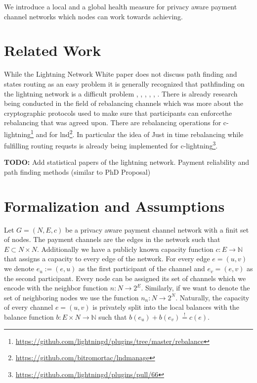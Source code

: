 \documentclass[a4paper]{paper}
\begin{document}
We introduce a local and a global health measure for privacy aware payment channel networks which nodes can work towards achieving.
\section{Related Work}
While the Lightning Network White paper \cite{poon2016bitcoin} does not discuss path finding and states routing as an easy problem it is generally recognized that pathfinding on the lightning network is a difficult problem \cite{piatkivskyi2018split}, \cite{prihodko2016flare}, \cite{bagaria2019boomerang}, \cite{pickhardt2019pathfinding}, \cite{grunspan2018ant}, \cite{sivaraman2018routing}.
There is already research being conducted in the field of rebalancing channels \cite{khalil2017revive} which was more about the cryptographic protocols used to make sure that participants can enforcethe rebalancing that was agreed upon.
There are rebalancing operations for c-lightning\footnote{\url{https://github.com/lightningd/plugins/tree/master/rebalance}} and for lnd\footnote{\url{https://github.com/bitromortac/lndmanage}}.
In particular the idea of Just in time rebalancing while fulfilling routing requsts \cite{pickhardt2019jit} is already being implemented for c-lightning\footnote{\url{https://github.com/lightningd/plugins/pull/66}}. 

\textbf{TODO:} Add statistical papers of the lightning network. Payment reliability and path finding methods (similar to PhD Proposal)


\section{Formalization and Assumptions}

Let $G=(N,E,c)$ be a privacy aware payment channel network with a finit set of nodes.
The payment channels are the edges in the network such that $E\subset N\times N$.
Additionally we have a publicly known capacity function $c: E\longrightarrow \mathbb{N}$ that assigns a capacity to every edge of the network.
For every edge $e=(u,v)$ we denote $e_u:=(e,u)$ as the first participant of the channel and $e_v=(e,v)$ as the second participant.
Every node can be assigned its set of channels which we encode with the neighbor function $n : N \longrightarrow 2^{E}$.
Similarly, if we want to denote the set of neighboring nodes we use the function $n_n : N \longrightarrow 2^{N}$.
Naturally, the capacity of every channel $e=(u,v)$ is privately split into the local balances with the balance function $b: E\times N\longrightarrow\mathbb{N}$ such that $b(e_u)+b(e_v)\stackrel{!}{=}c(e)$.
\end{document}
